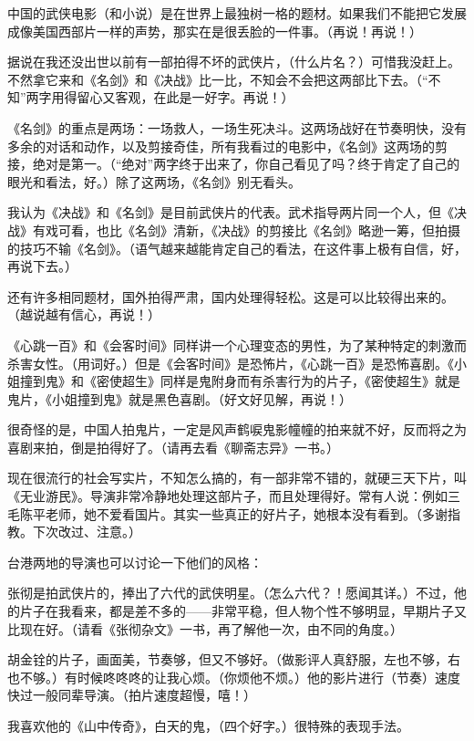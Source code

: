 \par 中国的武侠电影（和小说）是在世界上最独树一格的题材。如果我们不能把它发展成像美国西部片一样的声势，那实在是很丢脸的一件事。（再说！再说！）
\par 据说在我还没出世以前有一部拍得不坏的武侠片，（什么片名？）可惜我没赶上。不然拿它来和《名剑》和《决战》比一比，不知会不会把这两部比下去。（“不知”两字用得留心又客观，在此是一好字。再说！）
\par 《名剑》的重点是两场：一场救人，一场生死决斗。这两场战好在节奏明快，没有多余的对话和动作，以及剪接奇佳，所有我看过的电影中，《名剑》这两场的剪接，绝对是第一。（“绝对”两字终于出来了，你自己看见了吗？终于肯定了自己的眼光和看法，好。）除了这两场，《名剑》别无看头。
\par 我认为《决战》和《名剑》是目前武侠片的代表。武术指导两片同一个人，但《决战》有戏可看，也比《名剑》清新，《决战》的剪接比《名剑》略逊一筹，但拍摄的技巧不输《名剑》。（语气越来越能肯定自己的看法，在这件事上极有自信，好，再说下去。）
\par 还有许多相同题材，国外拍得严肃，国内处理得轻松。这是可以比较得出来的。（越说越有信心，再说！）
\par 《心跳一百》和《会客时间》同样讲一个心理变态的男性，为了某种特定的刺激而杀害女性。（用词好。）但是《会客时间》是恐怖片，《心跳一百》是恐怖喜剧。《小姐撞到鬼》和《密使超生》同样是鬼附身而有杀害行为的片子，《密使超生》就是鬼片，《小姐撞到鬼》就是黑色喜剧。（好文好见解，再说！）
\par 很奇怪的是，中国人拍鬼片，一定是风声鹤唳鬼影幢幢的拍来就不好，反而将之为喜剧来拍，倒是拍得好了。（请再去看《聊斋志异》一书。）
\par 现在很流行的社会写实片，不知怎么搞的，有一部非常不错的，就硬三天下片，叫《无业游民》。导演非常冷静地处理这部片子，而且处理得好。常有人说：例如三毛陈平老师，她不爱看国片。其实一些真正的好片子，她根本没有看到。（多谢指教。下次改过、注意。）
\par 台港两地的导演也可以讨论一下他们的风格：
\par 张彻是拍武侠片的，捧出了六代的武侠明星。（怎么六代？！愿闻其详。）不过，他的片子在我看来，都是差不多的——非常平稳，但人物个性不够明显，早期片子又比现在好。（请看《张彻杂文》一书，再了解他一次，由不同的角度。）
\par 胡金铨的片子，画面美，节奏够，但又不够好。（做影评人真舒服，左也不够，右也不够。）有时候咚咚咚的让我心烦。（你烦他不烦。）他的影片进行（节奏）速度快过一般同辈导演。（拍片速度超慢，嘻！）
\par 我喜欢他的《山中传奇》，白天的鬼，（四个好字。）很特殊的表现手法。
